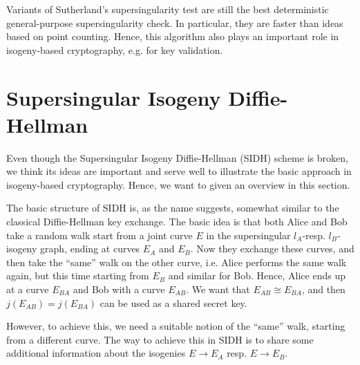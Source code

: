 Variants of Sutherland's supersingularity test are still the best deterministic general-purpose supersingularity check.
In particular, they are faster than ideas based on point counting.
Hence, this algorithm also plays an important role in isogeny-based cryptography, e.g. for key validation.

\section{Supersingular Isogeny Diffie-Hellman}
Even though the Supersingular Isogeny Diffie-Hellman (SIDH) scheme is broken, we think its ideas are important and serve well to illustrate the basic approach in isogeny-based cryptography.
Hence, we want to given an overview in this section.

The basic structure of SIDH is, as the name suggests, somewhat similar to the classical Diffie-Hellman key exchange.
The basic idea is that both Alice and Bob take a random walk start from a joint curve $E$ in the supersingular $l_A$-resp. $l_B$-isogeny graph, ending at curves $E_A$ and $E_B$.
Now they exchange these curves, and then take the ``same'' walk on the other curve, i.e. Alice performs the same walk again, but this time starting from $E_B$ and similar for Bob.
Hence, Alice ends up at a curve $E_{BA}$ and Bob with a curve $E_{AB}$.
We want that $E_{AB} \cong E_{BA}$, and then $j(E_{AB}) = j(E_{BA})$ can be used as a shared secret key.

However, to achieve this, we need a suitable notion of the ``same'' walk, starting from a different curve.
The way to achieve this in SIDH is to share some additional information about the isogenies $E \to E_A$ resp. $E \to E_B$.

